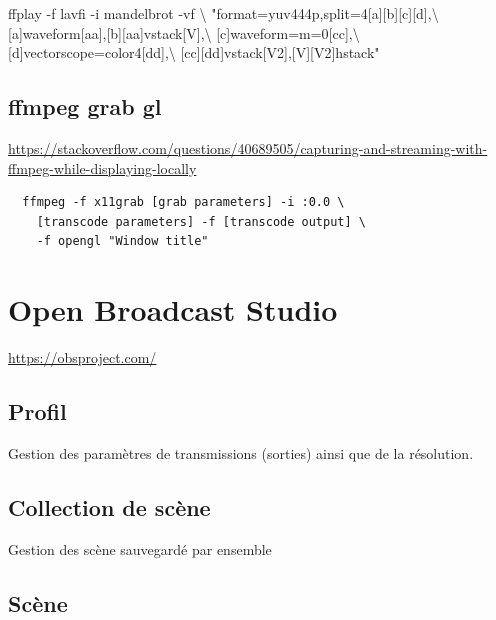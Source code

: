 \documentclass[
  french,
]{book}
\newenvironment{Shaded}{\begin{snugshade}}{\end{snugshade}}
\newcommand{\AttributeTok}[1]{\textcolor[rgb]{0.77,0.63,0.00}{#1}}
\newcommand{\DataTypeTok}[1]{\textcolor[rgb]{0.13,0.29,0.53}{#1}}
\newcommand{\ExtensionTok}[1]{#1}
\newcommand{\NormalTok}[1]{#1}
\newcommand{\StringTok}[1]{\textcolor[rgb]{0.31,0.60,0.02}{#1}}
\begin{document}
\begin{Shaded}
\begin{Highlighting}[]
\ExtensionTok{ffplay} \AttributeTok{{-}f}\NormalTok{ lavfi }\AttributeTok{{-}i}\NormalTok{ mandelbrot }\AttributeTok{{-}vf} \DataTypeTok{\textbackslash{}}
\StringTok{"format=yuv444p,split=4[a][b][c][d],}\DataTypeTok{\textbackslash{}}
\StringTok{[a]waveform[aa],[b][aa]vstack[V],}\DataTypeTok{\textbackslash{}}
\StringTok{[c]waveform=m=0[cc],}\DataTypeTok{\textbackslash{}}
\StringTok{[d]vectorscope=color4[dd],}\DataTypeTok{\textbackslash{}}
\StringTok{[cc][dd]vstack[V2],[V][V2]hstack"}
\end{Highlighting}
\end{Shaded}

\hypertarget{ffmpeg-grab-gl}{%
\section{ffmpeg grab gl}\label{ffmpeg-grab-gl}}

\url{https://stackoverflow.com/questions/40689505/capturing-and-streaming-with-ffmpeg-while-displaying-locally}

\begin{verbatim}
  ffmpeg -f x11grab [grab parameters] -i :0.0 \
    [transcode parameters] -f [transcode output] \
    -f opengl "Window title"
\end{verbatim}

\hypertarget{obs}{%
\chapter{Open Broadcast Studio}\label{obs}}

\url{https://obsproject.com/}

\hypertarget{profil}{%
\section{Profil}\label{profil}}

Gestion des paramètres de transmissions (sorties) ainsi que de la résolution.

\hypertarget{collection-de-scuxe8ne}{%
\section{Collection de scène}\label{collection-de-scuxe8ne}}

Gestion des scène sauvegardé par ensemble

\hypertarget{scuxe8ne}{%
\section{Scène}\label{scuxe8ne}}
\end{document}
